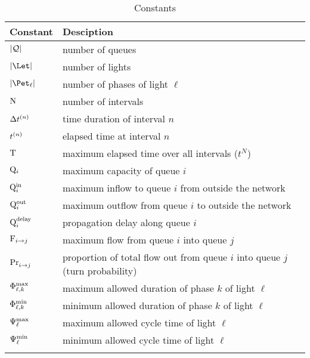 \begin{table}[t]
\caption{Constants}
\label{tab:constants}
\centering
\begin{tabular}{ll}
\toprule
Constant & Desciption\\ 
\midrule
$|\mathcal{\mathcal{Q}}|$ & number of queues  \\ [1mm]
$\Ln$ & number of lights\\ [1mm]
$\Pn$ & number of phases of light $\ell$\\[1mm]
$\mathrm{N}$ & number of intervals \\ [1mm]
$\Delta t^{(n)}$ & time duration of interval $n$\\ [1mm]
$t^{(n)}$ & elapsed time at interval $n$\\ [1mm]
$\mathrm{T}$ & maximum elapsed time over all intervals ($t^N$)\\ [1mm]
$\mathrm{Q}_{i}$ & maximum capacity of queue $i$\\ [1mm]
$\mathrm{Q}_{i}^{\mathrm{in}}$ & maximum inflow to queue $i$ from outside the network\\ [1mm]
$\mathrm{Q}_{i}^{\mathrm{out}}$ & maximum outflow from queue $i$ to outside the network\\[1mm]
$\mathrm{Q}_{i}^{\mathrm{delay}}$ & propagation delay along queue $i$\\[1mm]
$\mathrm{F}_{i\to j}$ & maximum flow from queue $i$ into queue $j$\\[1mm] 
$\mathrm{Pr}_{i\to j}^{\mathrm{}}$ & proportion of total flow out from queue $i$ into queue $j$ (turn probability)\\ [1mm]
$\mathrm{\Phi}_{\ell,k}^{\mathrm{max}}$ & maximum allowed duration of phase $k$ of light $\ell$\\ [1mm]
$\mathrm{\Phi}_{\ell,k}^{\mathrm{min}}$ & minimum allowed duration of phase $k$ of light $\ell$\\ [1mm]
$\mathrm{\Psi}_{\ell}^{\mathrm{max}}$ & maximum allowed cycle time of light $\ell$\\ [1mm]
$\mathrm{\Psi}_{\ell}^{\mathrm{min}}$ & minimum allowed cycle time of light $\ell$\\ [1mm]
\bottomrule\\
\end{tabular}
\end{table}

